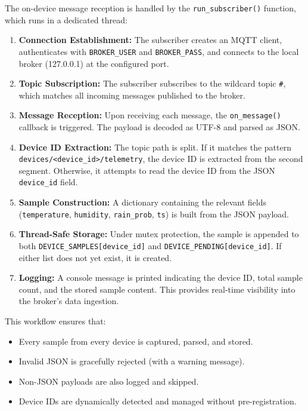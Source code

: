 The on-device message reception is handled by the \texttt{run\_subscriber()} function, which runs in a dedicated thread:
\begin{enumerate}
  \item \textbf{Connection Establishment:} The subscriber creates an MQTT client, authenticates with \texttt{BROKER\_USER} and \texttt{BROKER\_PASS}, and connects to the local broker (127.0.0.1) at the configured port.
  \item \textbf{Topic Subscription:} The subscriber subscribes to the wildcard topic \texttt{\#}, which matches all incoming messages published to the broker.
  \item \textbf{Message Reception:} Upon receiving each message, the \texttt{on\_message()} callback is triggered. The payload is decoded as UTF-8 and parsed as JSON.
  \item \textbf{Device ID Extraction:} The topic path is split. If it matches the pattern \texttt{devices/<device\_id>/telemetry}, the device ID is extracted from the second segment. Otherwise, it attempts to read the device ID from the JSON \texttt{device\_id} field.
  \item \textbf{Sample Construction:} A dictionary containing the relevant fields (\texttt{temperature}, \texttt{humidity}, \texttt{rain\_prob}, \texttt{ts}) is built from the JSON payload.
  \item \textbf{Thread-Safe Storage:} Under mutex protection, the sample is appended to both \texttt{DEVICE\_SAMPLES[device\_id]} and \texttt{DEVICE\_PENDING[device\_id]}. If either list does not yet exist, it is created.
  \item \textbf{Logging:} A console message is printed indicating the device ID, total sample count, and the stored sample content. This provides real-time visibility into the broker's data ingestion.
\end{enumerate}

This workflow ensures that:
\begin{itemize}
  \item Every sample from every device is captured, parsed, and stored.
  \item Invalid JSON is gracefully rejected (with a warning message).
  \item Non-JSON payloads are also logged and skipped.
  \item Device IDs are dynamically detected and managed without pre-registration.
\end{itemize}

